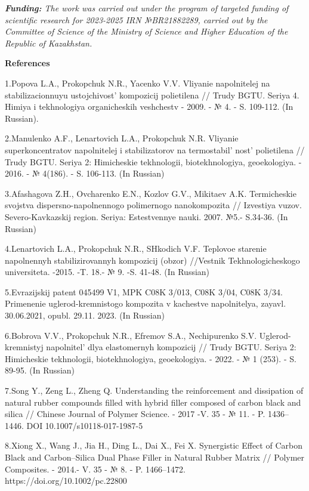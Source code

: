 \emph{{\bfseries Funding:} The work was carried out under the program of
targeted funding of scientific research for 2023-2025 IRN №BR21882289,
carried out by the Committee of Science of the Ministry of Science and
Higher Education of the Republic of Kazakhstan.}

{\bfseries References}

1.Popova L.A., Prokopchuk N.R., Yacenko V.V. Vliyanie napolnitelej na
stabilizacionnuyu ustojchivost'{} kompozicij polietilena
// Trudy BGTU. Seriya 4. Himiya i tekhnologiya organicheskih veshchestv
- 2009. - № 4. - S. 109-112. (In Russian).

2.Manulenko A.F., Lenartovich L.A., Prokopchuk N.R. Vliyanie
superkoncentratov napolnitelej i stabilizatorov na
termostabil' nost'{} polietilena // Trudy
BGTU. Seriya 2: Himicheskie tekhnologii, biotekhnologiya, geoekologiya.
- 2016. - № 4(186). - S. 106-113. (In Russian)

3.Afashagova Z.H., Ovcharenko E.N., Kozlov G.V., Mikitaev A.K.
Termicheskie svojstva dispersno-napolnennogo polimernogo nanokompozita
// Izvestiya vuzov. Severo-Kavkazskij region. Seriya: Estestvennye
nauki. 2007. №5.- S.34-36. (In Russian)

4.Lenartovich L.A., Prokopchuk N.R., SHkodich V.F. Teplovoe starenie
napolnennyh stabilizirovannyh kompozicij (obzor) //Vestnik
Tekhnologicheskogo universiteta. -2015. -T. 18.- № 9. -S. 41-48. (In
Russian)

5.Evrazijskij patent 045499 V1, MPK C08K 3/013, C08K 3/04, C08K 3/34.
Primenenie uglerod-kremnistogo kompozita v kachestve napolnitelya,
zayavl. 30.06.2021, opubl. 29.11. 2023. (In Russian)

6.Bobrova V.V., Prokopchuk N.R., Efremov S.A., Nechipurenko S.V.
Uglerod-kremnistyj napolnitel'{} dlya elastomernyh
kompozicij // Trudy BGTU. Seriya 2: Himicheskie tekhnologii,
biotekhnologiya, geoekologiya. - 2022. - № 1 (253). - S. 89-95. (In
Russian)

7.Song Y., Zeng L., Zheng Q. Understanding the reinforcement and
dissipation of natural rubber compounds filled with hybrid filler
composed of carbon black and silica // Chinese Journal of Polymer
Science. - 2017 -V. 35 - № 11. - P. 1436--1446. DOI
10.1007/s10118-017-1987-5

8.Xiong X., Wang J., Jia H., Ding L., Dai X., Fei X. Synergistic Effect
of Carbon Black and Carbon--Silica Dual Phase Filler in Natural Rubber
Matrix // Polymer Composites. - 2014.- V. 35 - № 8. - P. 1466--1472.
https://doi.org/10.1002/pc.22800

